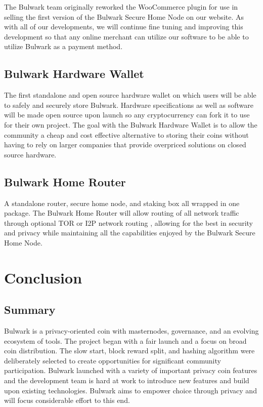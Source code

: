 \documentclass[11pt,a4paperpaper,]{report}
\begin{document}
The Bulwark team originally reworked the WooCommerce plugin for use in
selling the first version of the Bulwark Secure Home Node on our
website. As with all of our developments, we will continue fine tuning
and improving this development so that any online merchant can utilize
our software to be able to utilize Bulwark as a payment method.

\section{Bulwark Hardware Wallet}\label{bulwark-hardware-wallet}

The first standalone and open source hardware wallet on which users will
be able to safely and securely store Bulwark. Hardware specifications as
well as software will be made open source upon launch so any
cryptocurrency can fork it to use for their own project. The goal with
the Bulwark Hardware Wallet is to allow the community a cheap and cost
effective alternative to storing their coins without having to rely on
larger companies that provide overpriced solutions on closed source
hardware.

\section{Bulwark Home Router}\label{bulwark-home-router}

A standalone router, secure home node, and staking box all wrapped in
one package. The Bulwark Home Router will allow routing of all network
traffic through optional TOR or I2P network routing , allowing for the
best in security and privacy while maintaining all the capabilities
enjoyed by the Bulwark Secure Home Node.

\chapter{Conclusion}\label{conclusion}

\section{Summary}\label{summary}

Bulwark is a privacy-oriented coin with masternodes, governance, and an
evolving ecosystem of tools. The project began with a fair launch and a
focus on broad coin distribution. The slow start, block reward split,
and hashing algorithm were deliberately selected to create opportunities
for significant community participation. Bulwark launched with a variety
of important privacy coin features and the development team is hard at
work to introduce new features and build upon existing technologies.
Bulwark aims to empower choice through privacy and will focus
considerable effort to this end.
\end{document}
